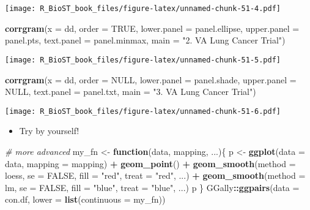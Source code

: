 \documentclass[
]{book}
\newenvironment{Shaded}{\begin{snugshade}}{\end{snugshade}}
\newcommand{\CommentTok}[1]{\textcolor[rgb]{0.56,0.35,0.01}{\textit{#1}}}
\newcommand{\ControlFlowTok}[1]{\textcolor[rgb]{0.13,0.29,0.53}{\textbf{#1}}}
\newcommand{\DataTypeTok}[1]{\textcolor[rgb]{0.13,0.29,0.53}{#1}}
\newcommand{\KeywordTok}[1]{\textcolor[rgb]{0.13,0.29,0.53}{\textbf{#1}}}
\newcommand{\NormalTok}[1]{#1}
\newcommand{\OperatorTok}[1]{\textcolor[rgb]{0.81,0.36,0.00}{\textbf{#1}}}
\newcommand{\OtherTok}[1]{\textcolor[rgb]{0.56,0.35,0.01}{#1}}
\newcommand{\StringTok}[1]{\textcolor[rgb]{0.31,0.60,0.02}{#1}}
\providecommand{\tightlist}{%
  \setlength{\itemsep}{0pt}\setlength{\parskip}{0pt}}
\begin{document}
\texttt{[image: R\_BioST\_book\_files/figure-latex/unnamed-chunk-51-4.pdf]}

\begin{Shaded}
\begin{Highlighting}[]
\KeywordTok{corrgram}\NormalTok{(}\DataTypeTok{x =}\NormalTok{ dd, }
         \DataTypeTok{order =} \OtherTok{TRUE}\NormalTok{, }
         \DataTypeTok{lower.panel =}\NormalTok{ panel.ellipse, }
         \DataTypeTok{upper.panel =}\NormalTok{ panel.pts, }
         \DataTypeTok{text.panel =}\NormalTok{ panel.minmax, }
         \DataTypeTok{main =} \StringTok{"2. VA Lung Cancer Trial"}\NormalTok{)}
\end{Highlighting}
\end{Shaded}

\texttt{[image: R\_BioST\_book\_files/figure-latex/unnamed-chunk-51-5.pdf]}

\begin{Shaded}
\begin{Highlighting}[]
\KeywordTok{corrgram}\NormalTok{(}\DataTypeTok{x =}\NormalTok{ dd, }
         \DataTypeTok{order =} \OtherTok{NULL}\NormalTok{, }
         \DataTypeTok{lower.panel =}\NormalTok{ panel.shade, }
         \DataTypeTok{upper.panel =} \OtherTok{NULL}\NormalTok{, }
         \DataTypeTok{text.panel =}\NormalTok{ panel.txt, }
         \DataTypeTok{main =} \StringTok{"3. VA Lung Cancer Trial"}\NormalTok{)}
\end{Highlighting}
\end{Shaded}

\texttt{[image: R\_BioST\_book\_files/figure-latex/unnamed-chunk-51-6.pdf]}

\begin{itemize}
\tightlist
\item
  Try by yourself!
\end{itemize}

\begin{Shaded}
\begin{Highlighting}[]
\CommentTok{\# more advanced}
\NormalTok{my\_fn \textless{}{-}}\StringTok{ }\ControlFlowTok{function}\NormalTok{(data, mapping, ...)\{}
\NormalTok{  p \textless{}{-}}\StringTok{ }\KeywordTok{ggplot}\NormalTok{(}\DataTypeTok{data =}\NormalTok{ data, }\DataTypeTok{mapping =}\NormalTok{ mapping) }\OperatorTok{+}\StringTok{ }
\StringTok{    }\KeywordTok{geom\_point}\NormalTok{() }\OperatorTok{+}\StringTok{ }
\StringTok{    }\KeywordTok{geom\_smooth}\NormalTok{(}\DataTypeTok{method =}\NormalTok{ loess, }\DataTypeTok{se =} \OtherTok{FALSE}\NormalTok{, }\DataTypeTok{fill =} \StringTok{"red"}\NormalTok{, }\DataTypeTok{treat =} \StringTok{"red"}\NormalTok{, ...) }\OperatorTok{+}
\StringTok{    }\KeywordTok{geom\_smooth}\NormalTok{(}\DataTypeTok{method =}\NormalTok{ lm, }\DataTypeTok{se =} \OtherTok{FALSE}\NormalTok{, }\DataTypeTok{fill =} \StringTok{"blue"}\NormalTok{, }\DataTypeTok{treat =} \StringTok{"blue"}\NormalTok{, ...)}
\NormalTok{  p}
\NormalTok{\}}
\NormalTok{GGally}\OperatorTok{::}\KeywordTok{ggpairs}\NormalTok{(}\DataTypeTok{data =}\NormalTok{ con.df, }
        \DataTypeTok{lower =} \KeywordTok{list}\NormalTok{(}\DataTypeTok{continuous =}\NormalTok{ my\_fn))}
\end{Highlighting}
\end{Shaded}
\end{document}
